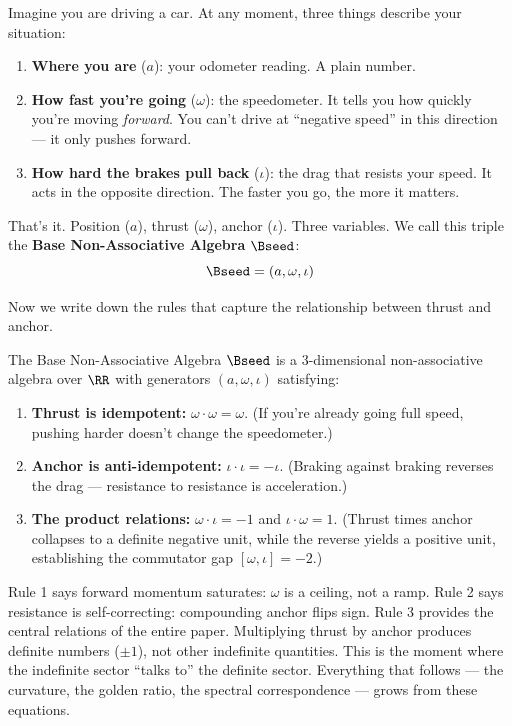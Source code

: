 Imagine you are driving a car. At any moment, three things describe your situation:
\begin{enumerate}
\item \textbf{Where you are} ($a$): your odometer reading. A plain number.
\item \textbf{How fast you're going} ($\omega$): the speedometer. It tells you how quickly you're moving \emph{forward}. You can't drive at ``negative speed'' in this direction --- it only pushes forward.
\item \textbf{How hard the brakes pull back} ($\iota$): the drag that resists your speed. It acts in the opposite direction. The faster you go, the more it matters.
\end{enumerate}

That's it. Position ($a$), thrust ($\omega$), anchor ($\iota$). Three variables. We call this triple the \textbf{Base Non-Associative Algebra} $\Bseed$:
$$\Bseed = (a, \omega, \iota)$$

Now we write down the rules that capture the relationship between thrust and anchor.

\begin{definition}\label{def:base}
The Base Non-Associative Algebra $\Bseed$ is a 3-dimensional non-associative algebra over $\RR$ with generators $(a, \omega, \iota)$ satisfying:
\begin{enumerate}
\item \textbf{Thrust is idempotent:} $\omega \cdot \omega = \omega$. (If you're already going full speed, pushing harder doesn't change the speedometer.)
\item \textbf{Anchor is anti-idempotent:} $\iota \cdot \iota = -\iota$. (Braking against braking reverses the drag --- resistance to resistance is acceleration.)
\item \textbf{The product relations:} $\omega \cdot \iota = -1$ and $\iota \cdot \omega = 1$. (Thrust times anchor collapses to a definite negative unit, while the reverse yields a positive unit, establishing the commutator gap $[\omega, \iota] = -2$.)
\end{enumerate}
\end{definition}

\begin{remark}
Rule 1 says forward momentum saturates: $\omega$ is a ceiling, not a ramp. Rule 2 says resistance is self-correcting: compounding anchor flips sign. Rule 3 provides the central relations of the entire paper. Multiplying thrust by anchor produces definite numbers ($\pm 1$), not other indefinite quantities. This is the moment where the indefinite sector ``talks to'' the definite sector. Everything that follows --- the curvature, the golden ratio, the spectral correspondence --- grows from these equations.
\end{remark}

